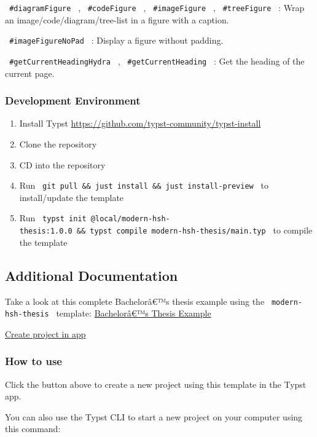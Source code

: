 \texttt{\ \#diagramFigure\ } , \texttt{\ \#codeFigure\ } ,
\texttt{\ \#imageFigure\ } , \texttt{\ \#treeFigure\ } : Wrap an
image/code/diagram/tree-list in a figure with a caption.

\texttt{\ \#imageFigureNoPad\ } : Display a figure without padding.

\texttt{\ \#getCurrentHeadingHydra\ } , \texttt{\ \#getCurrentHeading\ }
: Get the heading of the current page.

\subsubsection{Development Environment}\label{development-environment}

\begin{enumerate}
\tightlist
\item
  Install Typst \url{https://github.com/typst-community/typst-install}
\item
  Clone the repository
\item
  CD into the repository
\item
  Run
  \texttt{\ git\ pull\ \&\&\ just\ install\ \&\&\ just\ install-preview\ }
  to install/update the template
\item
  Run
  \texttt{\ typst\ init\ @local/modern-hsh-thesis:1.0.0\ \&\&\ typst\ compile\ modern-hsh-thesis/main.typ\ }
  to compile the template
\end{enumerate}

\subsection{Additional Documentation}\label{additional-documentation}

Take a look at this complete Bachelorâ€™s thesis example using the
\texttt{\ modern-hsh-thesis\ } template:
\href{https://github.com/MrToWy/Bachelorarbeit}{Bachelorâ€™s Thesis
Example}

\href{/app?template=modern-hsh-thesis&version=1.0.0}{Create project in
app}

\subsubsection{How to use}\label{how-to-use}

Click the button above to create a new project using this template in
the Typst app.

You can also use the Typst CLI to start a new project on your computer
using this command:

